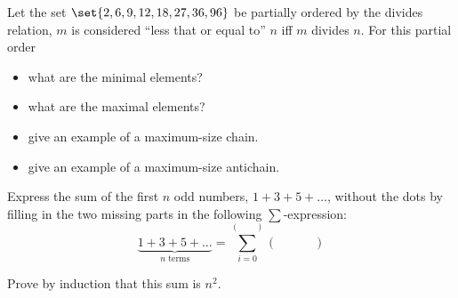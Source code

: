\documentclass[quiz]{mcs}
\begin{document}
\begin{problem}[2]
Let the set $\set{2,6,9,12,18,27,36,96}$ be \iffalse
(weakly)\fi partially ordered by
the divides relation, $m$ is considered ``less that or equal to'' $n$ iff
$m$ divides $n$.  For this partial order

\begin{itemize}

\item what are the minimal elements? \hfill\brule{1.5in}

\item what are the maximal elements? \hfill\brule{1.5in}

\item give an example of a maximum-size chain. \hfill\brule{1.5in}

\item give an example of a maximum-size antichain. \hfill\brule{1.5in}

\end{itemize}

\end{problem}
\inhandout{\instatements{\newpage}}

\begin{problem}[4]

\bparts

\ppart[1] Express the sum of the first $n$ odd numbers, $1+3+5+\dots$,
without the dots by filling in the two missing parts in the following
$\sum$-expression:
\[
\underbrace{1+3+5+\dots}_{n \text{ terms}} = \sum_{i=0}^{(\qquad)} (\quad\qquad)
\]

\ppart[3] Prove by induction that this sum is $n^2$.

\eparts
\end{problem}



\end{document}
